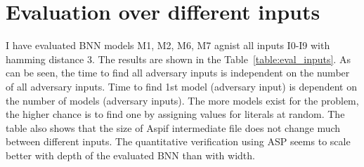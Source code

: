 \documentclass[
    digital,
    color,
    oneside,
    sansbold,
    lot,
    nolof
]{fithesis}
\begin{document}

\section{Evaluation over different inputs}

I have evaluated BNN models M1, M2, M6, M7 agnist all inputs I0-I9 with
hamming distance 3. The results are shown in the Table~\ref{table:eval_inputs}.
As can be seen, the time to find all adversary inputs is independent
on the number of all adversary inputs.
Time to find 1st model (adversary input) is dependent on the number
of models (adversary inputs). The more models exist for the problem, the higher
chance is to find one by assigning values for literals at random. The table
also shows that the size of Aspif intermediate file does not change much
between different inputs. The quantitative verification using ASP
seems to scale better with depth of the evaluated BNN than with width.
\end{document}
